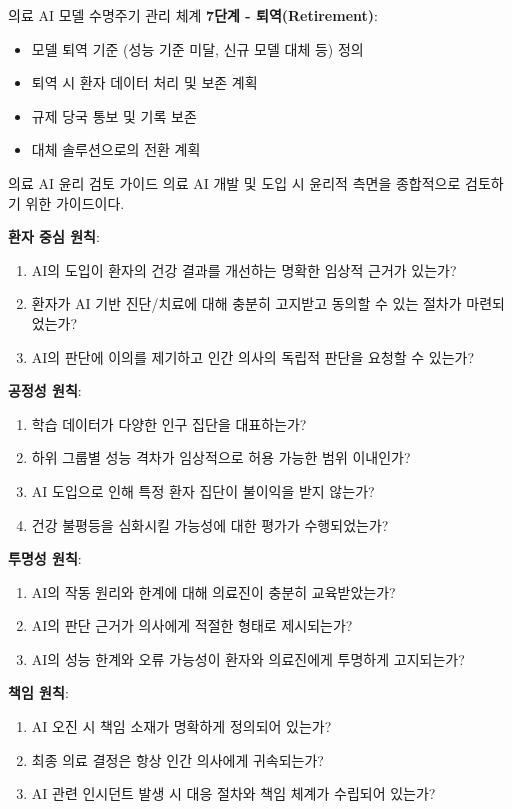 \begin{practicaltool}{의료 AI 모델 수명주기 관리 체계}
\textbf{7단계 - 퇴역(Retirement)}:
\begin{itemize}
 \item 모델 퇴역 기준 (성능 기준 미달, 신규 모델 대체 등) 정의
 \item 퇴역 시 환자 데이터 처리 및 보존 계획
 \item 규제 당국 통보 및 기록 보존
 \item 대체 솔루션으로의 전환 계획
\end{itemize}
\end{practicaltool}

\begin{practicaltool}{의료 AI 윤리 검토 가이드}
의료 AI 개발 및 도입 시 윤리적 측면을 종합적으로 검토하기 위한 가이드이다.

\textbf{환자 중심 원칙}:
\begin{enumerate}
 \item AI의 도입이 환자의 건강 결과를 개선하는 명확한 임상적 근거가 있는가?
 \item 환자가 AI 기반 진단/치료에 대해 충분히 고지받고 동의할 수 있는 절차가 마련되었는가?
 \item AI의 판단에 이의를 제기하고 인간 의사의 독립적 판단을 요청할 수 있는가?
\end{enumerate}

\textbf{공정성 원칙}:
\begin{enumerate}
 \item 학습 데이터가 다양한 인구 집단을 대표하는가?
 \item 하위 그룹별 성능 격차가 임상적으로 허용 가능한 범위 이내인가?
 \item AI 도입으로 인해 특정 환자 집단이 불이익을 받지 않는가?
 \item 건강 불평등을 심화시킬 가능성에 대한 평가가 수행되었는가?
\end{enumerate}

\textbf{투명성 원칙}:
\begin{enumerate}
 \item AI의 작동 원리와 한계에 대해 의료진이 충분히 교육받았는가?
 \item AI의 판단 근거가 의사에게 적절한 형태로 제시되는가?
 \item AI의 성능 한계와 오류 가능성이 환자와 의료진에게 투명하게 고지되는가?
\end{enumerate}

\textbf{책임 원칙}:
\begin{enumerate}
 \item AI 오진 시 책임 소재가 명확하게 정의되어 있는가?
 \item 최종 의료 결정은 항상 인간 의사에게 귀속되는가?
 \item AI 관련 인시던트 발생 시 대응 절차와 책임 체계가 수립되어 있는가?
\end{enumerate}


\end{practicaltool}
